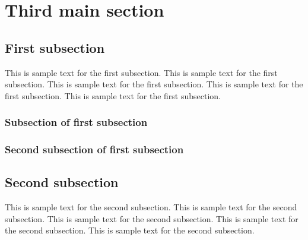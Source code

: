 \chapter{Third main section}

\section{First subsection}

This is sample text for the first subsection. This is sample text for the first
subsection. This is sample text for the first subsection. This is sample text
for the first subsection. This is sample text for the first subsection.

\subsection{Subsection of first subsection}

\subsection{Second subsection of first subsection}

\section{Second subsection}

This is sample text for the second subsection. This is sample text for the
second subsection. This is sample text for the second subsection. This is sample
text for the second subsection. This is sample text for the second subsection.
